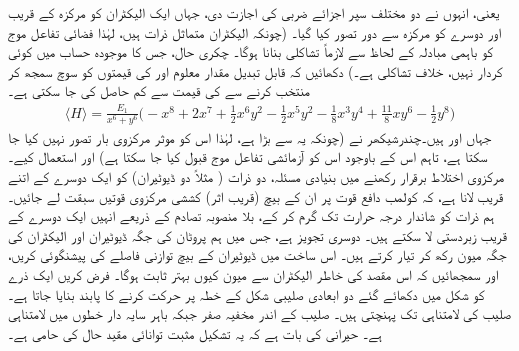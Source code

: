 یعنی، انہوں نے دو مختلف سپر اجزائے ضربی کی اجازت دی، جہاں ایک الیکٹران کو مرکزہ کے قریب اور دوسرے کو مرکزہ سے دور تصور کیا گیا۔ (چونکہ الیکٹران متماثل ذرات ہیں، لہٰذا فضائی تفاعل موج کو باہمی مبادلہ کے لحاظ سے لازماً تشاکلی بنانا ہوگا۔ چکری حال، جس کا موجودہ حساب میں کوئی کردار نہیں، خلاف تشاکلی ہے۔) دکھائیں کہ قابل تبدیل مقدار معلوم  اور  کی قیمتوں کو سوچ سمجھ کر منتخب کرنے سے  کی قیمت  سے کم حاصل کی جا سکتی ہے۔ 
\begin{align*}
\langle H \rangle = \frac{E_{1}}{x^{6}+y^{6}}\big(-x^{8}+2x^{7}+\frac{1}{2}x^{6}y^{2}-\frac{1}{2}x^{5}y^{2}-\frac{1}{8}x^{3}y^{4}+\frac{11}{8}xy^{6}-\frac{1}{2}y^{8}\big)
\end{align*}
 جہاں  اور  ہیں۔چندرشیکھر نے  (چونکہ یہ  سے بڑا ہے، لہٰذا اس کو موثر مرکزوی بار تصور نہیں کیا جا سکتا ہے، تاہم اس کے باوجود اس کو آزمائشی تفاعل موج قبول کیا جا سکتا ہے) اور  استعمال کیے۔
مرکزوی اختلاط برقرار رکھنے میں بنیادی مسئلہ، دو ذرات ( مثلاً دو ڈیوٹیران) کو ایک دوسرے کے اتنے قریب لانا ہے، کہ کولمب دافع قوت پر ان کے بیچ (قریب اثر) کششی مرکزوی قوتیں سبقت لے جائیں۔ ہم ذرات کو شاندار درجہ حرارت تک گرم کر کے، بلا منصوبہ تصادم کے ذریعے انہیں ایک دوسرے کے قریب زبردستی لا سکتے ہیں۔ دوسری تجویز  ہے، جس میں ہم پروٹان کی جگہ ڈیوٹیران اور الیکٹران کی جگہ میون رکھ کر  تیار کرتے ہیں۔ اس ساخت میں ڈیوٹیران کے بیچ توازنی فاصلے کی پیشنگوئی کریں، اور سمجھائیں کہ اس مقصد کی خاطر الیکٹران سے میون کیوں بہتر ثابت ہوگا۔
 
 فرض کریں ایک ذرے کو شکل  میں دکھائے گئے دو ابعادی صلیبی شکل کے خطہ پر حرکت کرنے کا پابند بنایا جاتا ہے۔ صلیب کی  لامتناہی تک پہنچتی ہیں۔ صلیب کے اندر مخفیہ صفر جبکہ باہر سایہ دار خطوں میں لامتناہی ہے۔ حیرانی کی بات ہے کہ یہ تشکیل مثبت توانائی مقید حال کی حامی ہے۔

